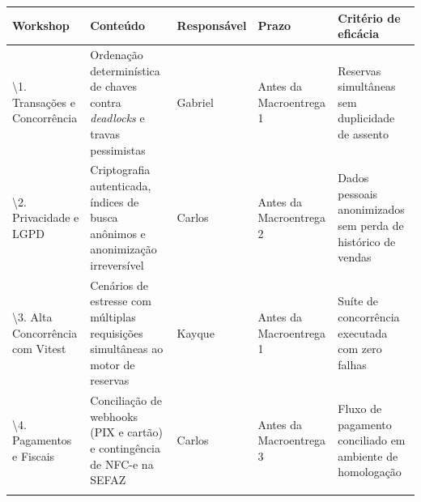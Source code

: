 {\footnotesize
\begin{tabularx}{\textwidth}{>{\hsize\sloppy\arraybackslash}X >{\hsize\sloppy\arraybackslash}X L{2.19cm} >{\hsize\sloppy\arraybackslash}X >{\hsize\sloppy\arraybackslash}X}
\toprule
{}
\textbf{Workshop} & \textbf{Conteúdo} & \textbf{Responsável} & \textbf{Prazo} & \textbf{Critério de eficácia} \\
\midrule
{}
\textbackslash1. Transações e Concorrência & Ordenação determinística de chaves contra \emph{deadlocks} e travas pessimistas & Gabriel & Antes da Macroentrega 1 & Reservas simultâneas sem duplicidade de assento \\
\midrule
\textbackslash2. Privacidade e LGPD & Criptografia autenticada, índices de busca anônimos e anonimização irreversível & Carlos & Antes da Macroentrega 2 & Dados pessoais anonimizados sem perda de histórico de vendas \\
\midrule
\textbackslash3. Alta Concorrência com Vitest & Cenários de estresse com múltiplas requisições simultâneas ao motor de reservas & Kayque & Antes da Macroentrega 1 & Suíte de concorrência executada com zero falhas \\
\midrule
\textbackslash4. Pagamentos e Fiscais & Conciliação de webhooks (PIX e cartão) e contingência de NFC-e na SEFAZ & Carlos & Antes da Macroentrega 3 & Fluxo de pagamento conciliado em ambiente de homologação \\
\bottomrule
\end{tabularx}%
}
